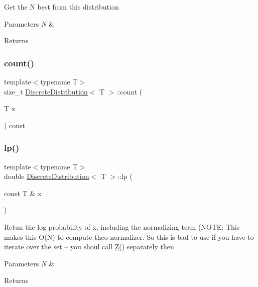 Get the N best from this distribution 
\begin{DoxyParams}{Parameters}
{\em N} & \\
\hline
\end{DoxyParams}
\begin{DoxyReturn}{Returns}

\end{DoxyReturn}
\mbox{\label{class_discrete_distribution_afd3fd83dc776f5616e826de18093328b}} 
\subsubsection{\texorpdfstring{count()}{count()}}
{\footnotesize\ttfamily template$<$typename T$>$ \\
size\+\_\+t \hyperlink{class_discrete_distribution}{Discrete\+Distribution}$<$ T $>$\+::count (\begin{DoxyParamCaption}\item[{T}]{x }\end{DoxyParamCaption}) const\hspace{0.3cm}{\ttfamily [inline]}}

\mbox{\label{class_discrete_distribution_a185ef689b1e133b962fff5bcf1443ba1}} 
\subsubsection{\texorpdfstring{lp()}{lp()}}
{\footnotesize\ttfamily template$<$typename T$>$ \\
double \hyperlink{class_discrete_distribution}{Discrete\+Distribution}$<$ T $>$\+::lp (\begin{DoxyParamCaption}\item[{const T \&}]{x }\end{DoxyParamCaption})\hspace{0.3cm}{\ttfamily [inline]}}

Retun the log probability of x, including the normalizing term (N\+O\+TE\+: This makes this O(\+N) to compute theo normalizer. So this is bad to use if you have to iterate over the set -- you shoul call \hyperlink{class_discrete_distribution_ad634a339172a69c006fded1beb423bb7}{Z()} separately then 
\begin{DoxyParams}{Parameters}
{\em N} & \\
\hline
\end{DoxyParams}
\begin{DoxyReturn}{Returns}

\end{DoxyReturn}
\mbox{\label{class_discrete_distribution_a5c93983e2375a2353b10b82ebb11f751}} 
